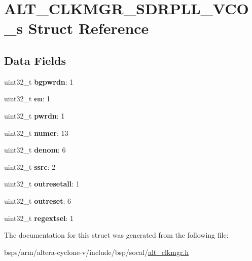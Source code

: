 \hypertarget{structALT__CLKMGR__SDRPLL__VCO__s}{}\section{A\+L\+T\+\_\+\+C\+L\+K\+M\+G\+R\+\_\+\+S\+D\+R\+P\+L\+L\+\_\+\+V\+C\+O\+\_\+s Struct Reference}
\label{structALT__CLKMGR__SDRPLL__VCO__s}
\subsection*{Data Fields}
\begin{DoxyCompactItemize}
\item 
\mbox{\label{structALT__CLKMGR__SDRPLL__VCO__s_aa6aaf3ea25fb425225fb7acae93bb064}} 
uint32\+\_\+t {\bfseries bgpwrdn}\+: 1
\item 
\mbox{\label{structALT__CLKMGR__SDRPLL__VCO__s_a36822db73630838aab752cfa842a1f10}} 
uint32\+\_\+t {\bfseries en}\+: 1
\item 
\mbox{\label{structALT__CLKMGR__SDRPLL__VCO__s_ae333132fc90b3f51e693b2c6f5c0348d}} 
uint32\+\_\+t {\bfseries pwrdn}\+: 1
\item 
\mbox{\label{structALT__CLKMGR__SDRPLL__VCO__s_a7201dcdee7c58489963c26068d6ffa19}} 
uint32\+\_\+t {\bfseries numer}\+: 13
\item 
\mbox{\label{structALT__CLKMGR__SDRPLL__VCO__s_adbfb7077d0f063d02681fa1875d4e051}} 
uint32\+\_\+t {\bfseries denom}\+: 6
\item 
\mbox{\label{structALT__CLKMGR__SDRPLL__VCO__s_af76120a9ae72a3bf3a7835dce7df2fec}} 
uint32\+\_\+t {\bfseries ssrc}\+: 2
\item 
\mbox{\label{structALT__CLKMGR__SDRPLL__VCO__s_aaa7fb746d95624d202261fde99d1700d}} 
uint32\+\_\+t {\bfseries outresetall}\+: 1
\item 
\mbox{\label{structALT__CLKMGR__SDRPLL__VCO__s_a033617ebaf6a0993c7637516c8f1c42c}} 
uint32\+\_\+t {\bfseries outreset}\+: 6
\item 
\mbox{\label{structALT__CLKMGR__SDRPLL__VCO__s_a1209c8e28608c111f7212810960aa3a9}} 
uint32\+\_\+t {\bfseries regextsel}\+: 1
\end{DoxyCompactItemize}


The documentation for this struct was generated from the following file\+:\begin{DoxyCompactItemize}
\item 
bsps/arm/altera-\/cyclone-\/v/include/bsp/socal/\mbox{\hyperlink{alt__clkmgr_8h}{alt\+\_\+clkmgr.\+h}}\end{DoxyCompactItemize}
